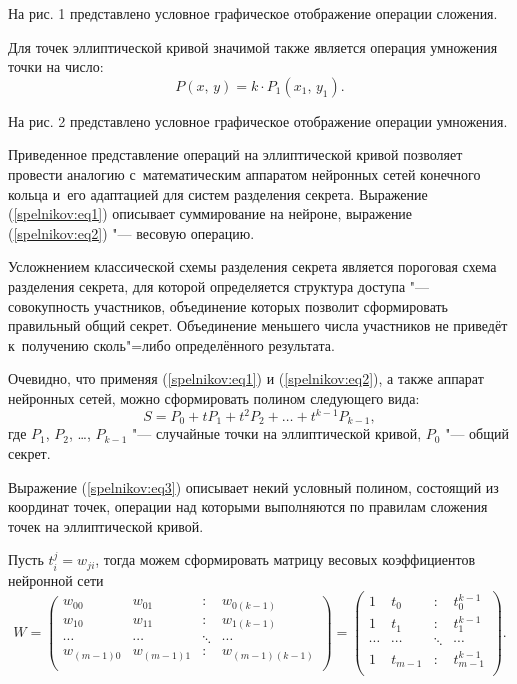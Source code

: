 \noindent
На рис. 1 представлено условное графическое отображение операции
сложения.

Для точек эллиптической кривой значимой также является операция умножения
точки на число:
\begin{equation}
\label{spelnikov:eq2}
P(x,\, y)=k\cdot P_1 (x_1,\, y_1 ).
\end{equation}




\noindent
На рис. 2 представлено условное графическое отображение операции
умножения.

Приведенное представление операций на эллиптической кривой позволяет
провести аналогию с~математическим аппаратом нейронных сетей конечного
кольца и~его адаптацией для систем разделения секрета.
Выражение (\ref{spelnikov:eq1})
описывает суммирование на нейроне, выражение (\ref{spelnikov:eq2}) "--- весовую операцию.

Усложнением классической схемы разделения секрета является пороговая схема
разделения секрета, для которой определяется структура доступа "---
совокупность участников, объединение которых позволит сформировать
правильный общий секрет.
Объединение меньшего числа участников не приведёт к~получению сколь"=либо определённого результата.

Очевидно, что применяя (\ref{spelnikov:eq1}) и (\ref{spelnikov:eq2}), а также аппарат нейронных сетей, можно
сформировать полином следующего вида:
\begin{equation}
\label{spelnikov:eq3}
S=P_0 +tP_1 +t^2P_2 +\dots +t^{k-1}P_{k-1} ,
\end{equation}
где $P_{1}$,  $P_{2}$, \dots, $P_{k-1}$ "--- случайные точки на эллиптической кривой,
$P_{0}$ "--- общий секрет.

Выражение (\ref{spelnikov:eq3}) описывает некий условный полином, состоящий из координат
точек, операции над которыми выполняются по правилам сложения точек на
эллиптической кривой.

Пусть $t_i^j =w_{ji} $, тогда можем сформировать матрицу весовых
коэффициентов нейронной сети
\begin{equation}
\label{spelnikov:eq4}
W=\left(\!\! \begin{array}{cccc}
 {w_{00} }  & {w_{01} }  & {\!\!\colon\!\!}  & {w_{0(k-1)} }
\\
 {w_{10} }  & {w_{11} }  & {\!\!\colon\!\!}  & {w_{1(k-1)} }
\\
 {\cdots}  & {\cdots}  & \!\!\ddots\!\!& {\cdots}  \\
 {w_{(m-1)0} }  & {w_{(m-1)1} }  & {\!\!\colon\!\!}  &
{w_{(m-1)(k-1)} }  \\
\end{array} \!\! \right)=
\left(\!\! \begin{array}{cccc}
 1  & {t_0 }  & {\colon}  & {t_0^{k-1} }  \\
 1  & {t_1 }  & {\colon}  & {t_1^{k-1} }  \\
 {\cdots}  & {\cdots}  & {\ddots}  & {\cdots}  \\
 1  & {t_{m-1} }  & {\colon}  & {t_{m-1}^{k-1} }  \\
\end{array} \!\! \right).
\end{equation}

